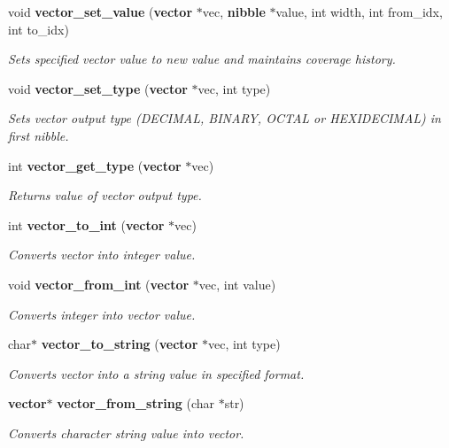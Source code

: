 \begin{CompactItemize}
void {\bf vector\_\-set\_\-value} ({\bf vector} $\ast$vec, {\bf nibble} $\ast$value, int width, int from\_\-idx, int to\_\-idx)
\begin{CompactList}\small\item\em Sets specified vector value to new value and maintains coverage history.\item\end{CompactList}\item 
void {\bf vector\_\-set\_\-type} ({\bf vector} $\ast$vec, int type)
\begin{CompactList}\small\item\em Sets vector output type (DECIMAL, BINARY, OCTAL or HEXIDECIMAL) in first nibble.\item\end{CompactList}\item 
int {\bf vector\_\-get\_\-type} ({\bf vector} $\ast$vec)
\begin{CompactList}\small\item\em Returns value of vector output type.\item\end{CompactList}\item 
int {\bf vector\_\-to\_\-int} ({\bf vector} $\ast$vec)
\begin{CompactList}\small\item\em Converts vector into integer value.\item\end{CompactList}\item 
void {\bf vector\_\-from\_\-int} ({\bf vector} $\ast$vec, int value)
\begin{CompactList}\small\item\em Converts integer into vector value.\item\end{CompactList}\item 
char$\ast$ {\bf vector\_\-to\_\-string} ({\bf vector} $\ast$vec, int type)
\begin{CompactList}\small\item\em Converts vector into a string value in specified format.\item\end{CompactList}\item 
{\bf vector}$\ast$ {\bf vector\_\-from\_\-string} (char $\ast$str)
\begin{CompactList}\small\item\em Converts character string value into vector.\item\end{CompactList}\item 

\end{CompactItemize}
